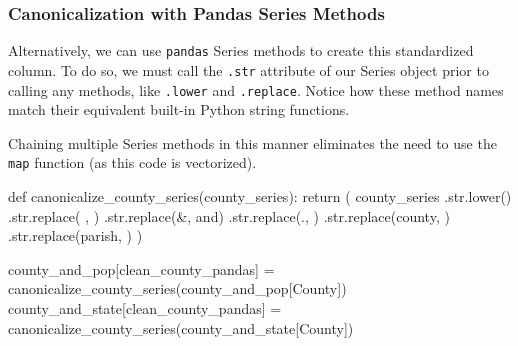 \documentclass[
  letterpaper,
  DIV=11,
  numbers=noendperiod]{scrreprt}
\newenvironment{Shaded}{\begin{snugshade}}{\end{snugshade}}
\newcommand{\BuiltInTok}[1]{\textcolor[rgb]{0.00,0.23,0.31}{#1}}
\newcommand{\ControlFlowTok}[1]{\textcolor[rgb]{0.00,0.23,0.31}{#1}}
\newcommand{\KeywordTok}[1]{\textcolor[rgb]{0.00,0.23,0.31}{#1}}
\newcommand{\NormalTok}[1]{\textcolor[rgb]{0.00,0.23,0.31}{#1}}
\newcommand{\OperatorTok}[1]{\textcolor[rgb]{0.37,0.37,0.37}{#1}}
\newcommand{\StringTok}[1]{\textcolor[rgb]{0.13,0.47,0.30}{#1}}
\begin{document}
\hypertarget{canonicalization-with-pandas-series-methods}{%
\subsubsection{Canonicalization with Pandas Series
Methods}\label{canonicalization-with-pandas-series-methods}}

Alternatively, we can use \texttt{pandas} Series methods to create this
standardized column. To do so, we must call the \texttt{.str} attribute
of our Series object prior to calling any methods, like \texttt{.lower}
and \texttt{.replace}. Notice how these method names match their
equivalent built-in Python string functions.

Chaining multiple Series methods in this manner eliminates the need to
use the \texttt{map} function (as this code is vectorized).

\begin{Shaded}
\begin{Highlighting}[]
\KeywordTok{def}\NormalTok{ canonicalize\_county\_series(county\_series):}
    \ControlFlowTok{return}\NormalTok{ (}
\NormalTok{        county\_series}
\NormalTok{            .}\BuiltInTok{str}\NormalTok{.lower()}
\NormalTok{            .}\BuiltInTok{str}\NormalTok{.replace(}\StringTok{\textquotesingle{} \textquotesingle{}}\NormalTok{, }\StringTok{\textquotesingle{}\textquotesingle{}}\NormalTok{)}
\NormalTok{            .}\BuiltInTok{str}\NormalTok{.replace(}\StringTok{\textquotesingle{}\&\textquotesingle{}}\NormalTok{, }\StringTok{\textquotesingle{}and\textquotesingle{}}\NormalTok{)}
\NormalTok{            .}\BuiltInTok{str}\NormalTok{.replace(}\StringTok{\textquotesingle{}.\textquotesingle{}}\NormalTok{, }\StringTok{\textquotesingle{}\textquotesingle{}}\NormalTok{)}
\NormalTok{            .}\BuiltInTok{str}\NormalTok{.replace(}\StringTok{\textquotesingle{}county\textquotesingle{}}\NormalTok{, }\StringTok{\textquotesingle{}\textquotesingle{}}\NormalTok{)}
\NormalTok{            .}\BuiltInTok{str}\NormalTok{.replace(}\StringTok{\textquotesingle{}parish\textquotesingle{}}\NormalTok{, }\StringTok{\textquotesingle{}\textquotesingle{}}\NormalTok{)}
\NormalTok{    )}

\NormalTok{county\_and\_pop[}\StringTok{\textquotesingle{}clean\_county\_pandas\textquotesingle{}}\NormalTok{] }\OperatorTok{=}\NormalTok{ canonicalize\_county\_series(county\_and\_pop[}\StringTok{\textquotesingle{}County\textquotesingle{}}\NormalTok{])}
\NormalTok{county\_and\_state[}\StringTok{\textquotesingle{}clean\_county\_pandas\textquotesingle{}}\NormalTok{] }\OperatorTok{=}\NormalTok{ canonicalize\_county\_series(county\_and\_state[}\StringTok{\textquotesingle{}County\textquotesingle{}}\NormalTok{])}
\end{Highlighting}
\end{Shaded}
\end{document}
